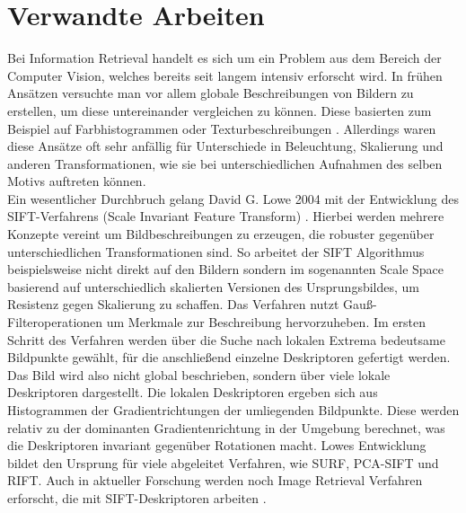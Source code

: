 \section*{Verwandte Arbeiten}
Bei Information Retrieval handelt es sich um ein Problem aus dem Bereich der Computer Vision, welches bereits seit langem intensiv erforscht wird. In frühen Ansätzen versuchte man vor allem globale Beschreibungen von Bildern zu erstellen, um diese untereinander vergleichen zu können. Diese basierten zum Beispiel auf Farbhistogrammen oder Texturbeschreibungen \cite{early_days}. Allerdings waren diese Ansätze oft sehr anfällig für Unterschiede in Beleuchtung, Skalierung und anderen Transformationen, wie sie bei unterschiedlichen Aufnahmen des selben Motivs auftreten können.
\\
Ein wesentlicher Durchbruch gelang David G. Lowe 2004 mit der Entwicklung des SIFT-Verfahrens (Scale Invariant Feature Transform) \cite{sift}. Hierbei werden mehrere Konzepte vereint um Bildbeschreibungen zu erzeugen, die robuster gegenüber unterschiedlichen Transformationen sind. So arbeitet der SIFT Algorithmus beispielsweise nicht direkt auf den Bildern sondern im sogenannten Scale Space basierend auf unterschiedlich skalierten Versionen des Ursprungsbildes, um Resistenz gegen Skalierung zu schaffen. Das Verfahren nutzt Gauß-Filteroperationen um Merkmale zur Beschreibung hervorzuheben. Im ersten Schritt des Verfahren werden über die Suche nach lokalen Extrema bedeutsame Bildpunkte gewählt, für die anschließend einzelne Deskriptoren gefertigt werden. Das Bild wird also nicht global beschrieben, sondern über viele lokale Deskriptoren dargestellt. Die lokalen Deskriptoren ergeben sich aus Histogrammen der Gradientrichtungen der umliegenden Bildpunkte. Diese werden relativ zu der dominanten Gradientenrichtung in der Umgebung berechnet, was die Deskriptoren invariant gegenüber Rotationen macht. Lowes Entwicklung bildet den Ursprung für viele abgeleitet Verfahren, wie SURF\cite{surf}, PCA-SIFT\cite{pca_sift} und RIFT\cite{rift}. Auch in aktueller Forschung werden noch Image Retrieval Verfahren erforscht, die mit SIFT-Deskriptoren arbeiten \cite{modern_sift_useage}. \\
